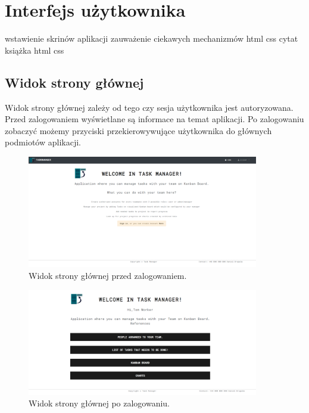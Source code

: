 \chapter{Interfejs użytkownika}
wstawienie skrinów aplikacji zauważenie ciekawych mechanizmów html css cytat książka html css
\section{Widok strony głównej}
Widok strony głównej zależy od tego czy sesja użytkownika jest autoryzowana. Przed zalogowaniem wyświetlane są informace na temat aplikacji. Po zalogowaniu zobaczyć możemy przyciski przekierowywujące użytkownika do głównych podmiotów aplikacji.
\begin{figure}[h!]
	\centering
	\includegraphics[width=0.90\textwidth]{home-not-auth}
	
	\caption{Widok strony głównej przed zalogowaniem.}
	\label{not-auth-home}
\end{figure}

\begin{figure}[h!]
	\centering
	\includegraphics[width=0.90\textwidth]{home-auth}
	
	\caption{Widok strony głównej po zalogowaniu.}
\label{auth-home}
\end{figure}

